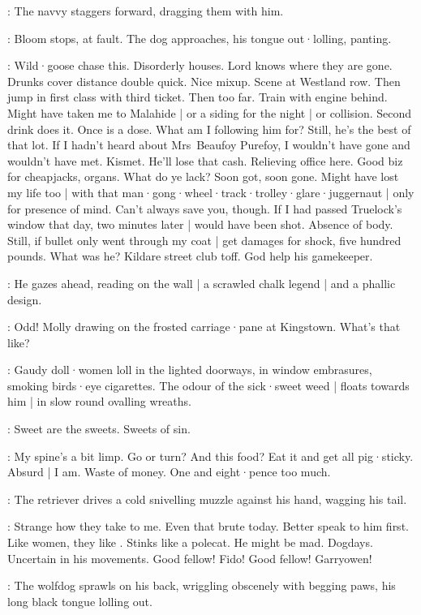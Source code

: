 :
The navvy staggers forward,
dragging them with him.

:
Bloom stops,
at fault.
The dog approaches,
his tongue out·lolling,
panting.

\Bloom:
Wild·goose chase this.
Disorderly houses.
Lord knows where they are gone.
Drunks cover distance double quick.
Nice mixup.
Scene at Westland row.
Then jump in first class with third ticket.
Then too far.
Train with engine behind.
Might have taken me to Malahide |
or a siding for the night  |
or collision.
Second drink does it.
Once is a dose.
What am I following him for?
Still,
he's the best of that lot.
If I hadn't heard about Mrs~Beaufoy Purefoy,
I wouldn't have gone and wouldn't have met.
Kismet.
He'll lose that cash.
Relieving office here.
Good biz for cheapjacks,
organs.
What do ye lack?
Soon got,
soon gone.
Might have lost my life too |
with that man·gong·wheel·track·trolley·glare·juggernaut |
only for presence of mind.
Can't always save you,
though.
If I had passed Truelock's window that day,
two minutes later |
would have been shot.
Absence of body.
Still,
if bullet only went through my coat |
get damages for shock,
five hundred pounds.
What was he?
Kildare street club toff.
God help his gamekeeper.

:
He gazes ahead,
reading on the wall |
a scrawled chalk legend  |
and a phallic design.

\Bloom:
%
Odd!
Molly drawing on the frosted carriage·pane at Kingstown.
What's that like?

:
Gaudy doll·women loll in the lighted doorways,
in window embrasures,
smoking birds·eye cigarettes.
The odour of the sick·sweet weed |
floats towards him |
in slow round ovalling wreaths.

\Wreaths:
Sweet are the sweets.
Sweets of sin.

\Bloom:
My spine's a bit limp.
Go or turn?
And this food?
Eat it and get all pig·sticky.
Absurd |
I am.
Waste of money.
One and eight·pence too much.

:
The retriever drives a cold snivelling muzzle against his hand,
wagging his tail.

\Bloom:
Strange how they take to me.
Even that brute today.
Better speak to him first.
Like women,
they like .
Stinks like a polecat.
He might be mad.
Dogdays.
Uncertain in his movements.
Good fellow!
Fido!
Good fellow!
Garryowen!

:
The wolfdog sprawls on his back,
wriggling obscenely with begging paws,
his long black tongue lolling out.

